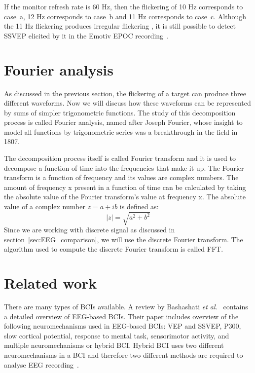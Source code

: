 If the monitor refresh rate is 60 Hz, then the flickering of 10 Hz corresponds to case~a, 12 Hz corresponds to case~b and 11 Hz corresponds to case~c. Although the 11 Hz flickering produces irregular flickering \cite{11hz}, it is still possible to detect \gls{SSVEP} elicited by it in the Emotiv EPOC recording~\cite{emotiv_11hz}.


\section{Fourier analysis}
\label{sec:fourier}

As discussed in the previous section, the flickering of a target can produce three different waveforms. Now we will discuss how these waveforms can be represented by sums of simpler trigonometric functions. The study of this decomposition process is called Fourier analysis, named after Joseph Fourier, whose insight to model all functions by trigonometric series was a breakthrough in the field in 1807.

The decomposition process itself is called Fourier transform and it is used to decompose a function of time into the frequencies that make it up. The Fourier transform is a function of frequency and its values are complex numbers. The amount of frequency x present in a function of time can be calculated by taking the absolute value of the Fourier transform's value at frequency x. The absolute value of a complex number $z=a+ib$ is defined as:
\begin{equation}
	|z|=\sqrt{a^2+b^2}
\end{equation}
Since we are working with discrete signal as discussed in section~\ref{sec:EEG_comparison}, we will use the discrete Fourier transform. The algorithm used to compute the discrete Fourier transform is called \gls{FFT}.

\section{Related work}

There are many types of \glspl{BCI} available. A review by Bashashati \textit{et al.}~\cite{bci_comparison} contains a detailed overview of \gls{EEG}-based \glspl{BCI}. Their paper includes overview of the following neuromechanisms used in \gls{EEG}-based \glspl{BCI}: \gls{VEP} and \gls{SSVEP}, P300, slow cortical potential, response to mental task, sensorimotor activity, and multiple neuromechanisms or hybrid \gls{BCI}. Hybrid \gls{BCI} uses two different neuromechanisms in a \gls{BCI} and therefore two different methods are required to analyse \gls{EEG} recording~\cite{hybrid_bci, hybrid_bci2}. %

